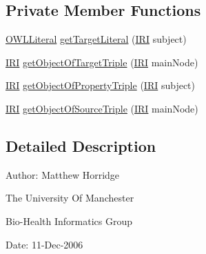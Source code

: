 \subsection*{Private Member Functions}
\begin{DoxyCompactItemize}
\item 
\hyperlink{interfaceorg_1_1semanticweb_1_1owlapi_1_1model_1_1_o_w_l_literal}{O\-W\-L\-Literal} \hyperlink{classorg_1_1coode_1_1owlapi_1_1rdfxml_1_1parser_1_1_type_axiom_handler_a427d50ff2953140558afdc9c617e2fd9}{get\-Target\-Literal} (\hyperlink{classorg_1_1semanticweb_1_1owlapi_1_1model_1_1_i_r_i}{I\-R\-I} subject)
\item 
\hyperlink{classorg_1_1semanticweb_1_1owlapi_1_1model_1_1_i_r_i}{I\-R\-I} \hyperlink{classorg_1_1coode_1_1owlapi_1_1rdfxml_1_1parser_1_1_type_axiom_handler_ab7296074e9cb5aad6245a94ff74dd065}{get\-Object\-Of\-Target\-Triple} (\hyperlink{classorg_1_1semanticweb_1_1owlapi_1_1model_1_1_i_r_i}{I\-R\-I} main\-Node)
\item 
\hyperlink{classorg_1_1semanticweb_1_1owlapi_1_1model_1_1_i_r_i}{I\-R\-I} \hyperlink{classorg_1_1coode_1_1owlapi_1_1rdfxml_1_1parser_1_1_type_axiom_handler_a6c42ea0c594b6ff9530e0a4c837dc82c}{get\-Object\-Of\-Property\-Triple} (\hyperlink{classorg_1_1semanticweb_1_1owlapi_1_1model_1_1_i_r_i}{I\-R\-I} subject)
\item 
\hyperlink{classorg_1_1semanticweb_1_1owlapi_1_1model_1_1_i_r_i}{I\-R\-I} \hyperlink{classorg_1_1coode_1_1owlapi_1_1rdfxml_1_1parser_1_1_type_axiom_handler_a474f840fbc33aa85fa44dd954dcfb475}{get\-Object\-Of\-Source\-Triple} (\hyperlink{classorg_1_1semanticweb_1_1owlapi_1_1model_1_1_i_r_i}{I\-R\-I} main\-Node)
\end{DoxyCompactItemize}


\subsection{Detailed Description}
Author\-: Matthew Horridge\par
 The University Of Manchester\par
 Bio-\/\-Health Informatics Group\par
 Date\-: 11-\/\-Dec-\/2006\par
\par
 

